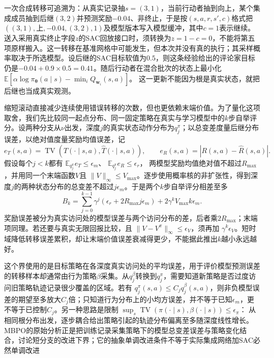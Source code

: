 一次合成转移可追溯为：从真实记录抽$s=(3,1)$，当前行动者抽到向上，某个集成成员抽到后继$(3,2)$并预测奖励$-0.04$、非终止，于是按$(s,a,r,s',c)$格式把
$((3,1),\text{上},-0.04,(3,2),1)$及模型版本写入模型缓冲，其中$c=1$表示继续。送入采用真实终止字段$z$的SAC回放接口时，须转换为$z=1-c=0$，不能将第五项原样搬入。这一转移在基准网格中可能发生，但本次并没有真的执行；其采样概率取决于所选模型。设后继的SAC目标软值为$0.5$，则这条经验给出的评论家目标仍是$-0.04+0.9\times0.5=0.41$。随后行动者在混合批次的状态上最小化
$\mathbb E[\alpha\log\pi_{\bm\theta}(a\mid s)-\min_iQ_{\bm w_i}(s,a)]$。
这一更新不能因为根是真实状态，就把后继也当成真实观测。

缩短滚动直接减少连续使用错误转移的次数，但也更依赖末端价值。为了量化这项取舍，我们先比较同一起点分布、同一固定策略在真实与学习模型中的$k$步自举评分。设两种分支从$\nu$出发，深度$j$的真实状态动作分布为$q_j^\pi$；以总变差度量后继分布误差，以绝对值度量奖励均值误差，记
\[
 e_T(s,a)=\operatorname{TV}(T(\cdot\mid s,a),\widehat T(\cdot\mid s,a)),
 \qquad e_R(s,a)=|R(s,a)-\widehat R(s,a)|.
\]
假设每个$j<k$都有
$\mathbb E_{q_j^\pi}e_T\leq\epsilon_m$、
$\mathbb E_{q_j^\pi}e_R\leq\epsilon_r$，
两模型奖励均值绝对值不超过$R_{\max}$，并用同一个末端函数$V$且
$\|V\|_\infty\leq V_{\max}$。逐步使用概率核的非扩张性，得到深度$j$的两种状态分布的总变差不超过$j\epsilon_m$。于是两个$k$步自举评分相差至多
\begin{equation}
 B_k=
   \sum_{j=0}^{k-1}\gamma^j
       (\epsilon_r+2R_{\max}j\epsilon_m)
       +2\gamma^kV_{\max}k\epsilon_m.
 \label{eq:rl-learning-short-model-bound}
\end{equation}
奖励误差被分为真实访问处的模型误差与两个访问分布的差，后者乘$2R_{\max}$；末端项同理。若还要与真实无限回报比较，且
$\|V-V^\pi\|_\infty\leq\epsilon_V$，须再加
$\gamma^k\epsilon_V$。短时域降低转移误差累积，却让末端价值误差衰减得更少，不能据此推出$k$越小永远越好。

这个界使用的是目标策略在各深度真实访问处的平均误差，用于评价模型预测误差的转移样本却通常由行为策略$\beta$采集。从$q_j^\beta$转换到$q_j^\pi$，需要知道新策略是否过度访问旧策略轨迹记录很少覆盖的区域。若有
$q_j^\pi(s,a)\leq C_jq_j^\beta(s,a)$，则非负模型误差的期望至多放大$C_j$倍；只知道行为分布上的小均方误差，并不等于已知$\epsilon_m$，更不等于已控制$C_j$。另一种思路是限制
$\sup_s\operatorname{TV}(\pi(\cdot\mid s),\beta(\cdot\mid s))\leq\epsilon_\pi$：
从相同根分布出发，逐步耦合给出策略引起的轨迹分布偏离至多随深度线性增长。MBPO的原始分析正是把训练记录采集策略下的模型总变差误差与策略变化结合，讨论短分支的改进下界；它的抽象单调改进条件不等于实际集成网络加SAC必然单调改进

